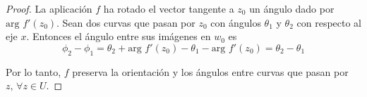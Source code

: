\begin{proof}
    La aplicación $f$ ha rotado el vector tangente a $z_0$ un ángulo dado por $\text{arg } f'(z_0)$. Sean dos curvas que pasan por $z_0$ con ángulos $\theta_1$ y $\theta_2$ con respecto al eje $x$. Entonces el ángulo entre sus imágenes en $w_0$ es 
    \begin{equation*}
        \phi_2 - \phi_1 = \theta_2 + \text{arg } f'(z_0) - \theta_1 - \text{arg } f'(z_0) = \theta_2 - \theta_1
    \end{equation*}

    Por lo tanto, $f$ preserva la orientación y los ángulos entre curvas que pasan por $z, \, \forall z \in U$.

    \begin{comment}
        $(\Rightarrow)$ Supongamos que $f$ es conforme y que $\frac{\partial f}{\partial x}$ y $\frac{\partial f}{\partial y}$ son continuas. En este caso tenemos
        \begin{equation*}
            w'(t_0) = \dfrac{\partial f}{\partial x} x'(t_0) +  \dfrac{\partial f}{\partial y} y'(t_0)
        \end{equation*}

        Podemos reescribir esto de la siguiente manera
        \begin{equation*}
            w'(t_0) = \dfrac{1}{2} \left( \dfrac{\partial f}{\partial x} - i\dfrac{\partial f}{\partial y} \right) z'(t_0) + \dfrac{1}{2} \left( \dfrac{\partial f}{\partial x} + i\dfrac{\partial f}{\partial y} \right) \xbar{z'(t_0)}
        \end{equation*}

        Si los ángulos se preservan entonces $\arg{(w'(t_0/z'(t_0)))}$ es independiente de $z'(t_0)$. Así,
        \begin{equation*}
            \dfrac{1}{2} \left( \dfrac{\partial f}{\partial x} - i\dfrac{\partial f}{\partial y} \right) + \dfrac{1}{2} \left( \dfrac{\partial f}{\partial x} + i\dfrac{\partial f}{\partial y} \right) \left( \dfrac{\xbar{z'(t_0)}}{z'(t_0)} \right)
        \end{equation*}
        tiene argumento constante.

        Supongamos que $z'(t_0) = re^{i \theta}$. Entonces
        \begin{equation*}
            \dfrac{\xbar{z'(t_0)}}{z'(t_0)} = \dfrac{re^{-i \theta}}{re^{i \theta}} = e^{-2i \theta}
        \end{equation*}

        Mientras $z'(t_0)$ varía, la curva describe una circunferencia de radio $\frac{1}{2} \abs{\frac{\partial f}{\partial x} - i\frac{\partial f}{\partial y}}$. El argumento solo puede ser constante si $\frac{\partial f}{\partial x} - i\frac{\partial f}{\partial y}$ es cero. Como hemos visto, estas ecuaciones implican que es holomorfa.
    \end{comment}
\end{proof}

